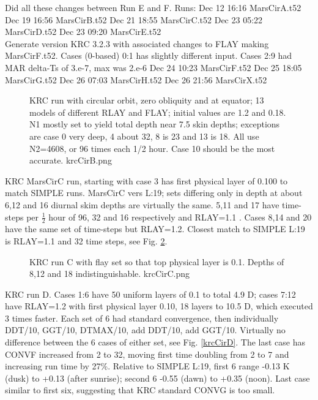 \documentclass{article}
\begin{document}
Did all these changes between Run E and F. Runs:
 Dec 12 16:16 MarsCirA.t52
 Dec 19 16:56 MarsCirB.t52
 Dec 21 18:55 MarsCirC.t52
 Dec 23 05:22 MarsCirD.t52
 Dec 23 09:20 MarsCirE.t52
\\ Generate version KRC 3.2.3 with associated changes to FLAY making MarsCirF.t52. Cases (0-based) 0:1 has slightly different input. Cases 2:9 had MAR delta-Ts of 3.e-7, max was 2.e-6
 Dec 24 10:23 MarsCirF.t52
 Dec 25 18:05 MarsCirG.t52
 Dec 26 07:03 MarsCirH.t52
 Dec 26 21:56 MarsCirX.t52

\begin{figure}[!ht] 
\caption[KRC RLAY tests]{KRC run with circular orbit, zero obliquity and at
  equator; 13 models of different RLAY and FLAY; initial values are 1.2 and
  0.18. N1 mostly set to yield total depth near 7.5 skin depths; exceptions are
  case 0 very deep, 4 about 32, 8 is 23 and 13 is 18. All use N2=4608, or 96
  times each 1/2 hour. Case 10 should be the most accurate.
\label{krcCirB} krcCirB.png }
\end{figure} 

KRC MarsCirC run, starting with case 3 has first physical layer of 0.100 to
match SIMPLE runs. MarsCirC vers L:19; sets differing only in depth at about 6,12 and 16 diurnal
skim depths are virtually the same. 5,11 and 17 have time-steps per
$\frac{1}{2}$ hour of 96, 32 and 16 respectively and RLAY=1.1 . Cases 8,14 and
20 have the same set of time-steps but RLAY=1.2.  Closest match to SIMPLE L:19
is RLAY=1.1 and 32 time steps, see Fig. \ref{krcCirC}.

\begin{figure}[!ht] 
\caption[KRC flay=.1 tests]{KRC run C with flay set so that top physical layer
  is 0.1. Depths of 8,12 and 18 indistinguishable.
\label{krcCirC} krcCirC.png }
\end{figure} 

KRC run D. Cases 1:6 have 50 uniform layers of 0.1 to total 4.9 D; cases 7:12
have RLAY=1.2 with first physical layer 0.10, 18 layers to 10.5 D, which
executed 3 times faster. Each set of 6 had standard convergence, then
individually DDT/10, GGT/10, DTMAX/10, add DDT/10, add GGT/10. Virtually no
difference between the 6 cases of either set, see Fig. \ref{krcCirD}. The last
case has CONVF increased from 2 to 32, moving first time doubling from 2 to 7
and increasing run time by 27\%. Relative to SIMPLE L:19, first 6 range -0.13 K
(dusk) to +0.13 (after sunrise); second 6 -0.55 (dawn) to +0.35 (noon). Last
case similar to first six, suggesting that KRC standard CONVG is too small.
\end{document}
